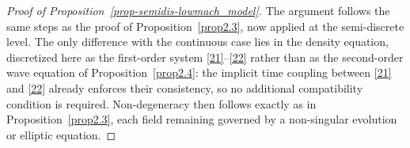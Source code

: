 \documentclass[pdflatex,final,10pt]{article}
\newcommand{\Liu}[1]{#1}
\newenvironment{del}
  {}
  {}
\begin{document}
\begin{del}
\begin{proof}[Proof of Proposition~\ref{prop-semidis-lowmach_model}]
The argument follows the same steps as the proof of Proposition~\ref{prop2.3}, now applied at the semi-discrete level. The only difference with the continuous case lies in the density equation, discretized here as the first-order system \eqref{21}--\eqref{22} rather than as the second-order wave equation of Proposition~\ref{prop2.4}: the implicit time coupling between \eqref{21} and \eqref{22} already enforces their consistency, so no additional compatibility condition is required. Non-degeneracy then follows exactly as in Proposition~\ref{prop2.3}, each field remaining governed by a non-singular evolution or elliptic equation.
\end{proof}
\end{del}


\end{document}
